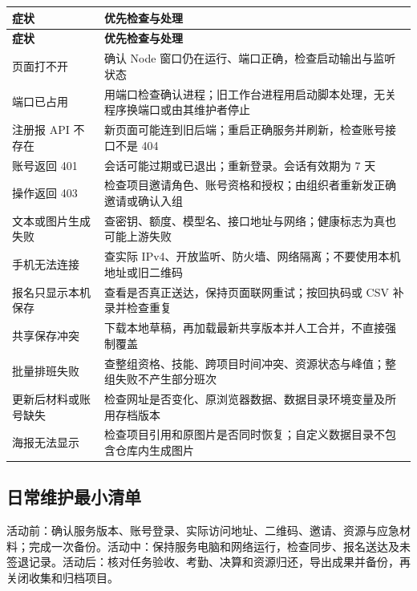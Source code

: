 \documentclass[UTF8,fontset=windows,zihao=-4,a4paper]{ctexart}
\begin{document}
\begingroup\small\setlength{\tabcolsep}{5pt}\renewcommand{\arraystretch}{1.28}
\begin{longtable}{>{\raggedright\arraybackslash}p{0.28\dimexpr\linewidth-4\tabcolsep\relax}>{\raggedright\arraybackslash}p{0.72\dimexpr\linewidth-4\tabcolsep\relax}}
\toprule
\textbf{症状} & \textbf{优先检查与处理} \\
\midrule\endfirsthead
\toprule
\textbf{症状} & \textbf{优先检查与处理} \\
\midrule\endhead
\bottomrule\endfoot
页面打不开 & 确认 Node 窗口仍在运行、端口正确，检查启动输出与监听状态 \\
端口已占用 & 用端口检查确认进程；旧工作台进程用启动脚本处理，无关程序换端口或由其维护者停止 \\
注册报 API 不存在 & 新页面可能连到旧后端；重启正确服务并刷新，检查账号接口不是 404 \\
账号返回 401 & 会话可能过期或已退出；重新登录。会话有效期为 7 天 \\
操作返回 403 & 检查项目邀请角色、账号资格和授权；由组织者重新发正确邀请或确认入组 \\
文本或图片生成失败 & 查密钥、额度、模型名、接口地址与网络；健康标志为真也可能上游失败 \\
手机无法连接 & 查实际 IPv4、开放监听、防火墙、网络隔离；不要使用本机地址或旧二维码 \\
报名只显示本机保存 & 查看是否真正送达，保持页面联网重试；按回执码或 CSV 补录并检查重复 \\
共享保存冲突 & 下载本地草稿，再加载最新共享版本并人工合并，不直接强制覆盖 \\
批量排班失败 & 查整组资格、技能、跨项目时间冲突、资源状态与峰值；整组失败不产生部分班次 \\
更新后材料或账号缺失 & 检查网址是否变化、原浏览器数据、数据目录环境变量及所用存档版本 \\
海报无法显示 & 检查项目引用和原图片是否同时恢复；自定义数据目录不包含仓库内生成图片 \\
\end{longtable}\endgroup

\subsection*{日常维护最小清单}

活动前：确认服务版本、账号登录、实际访问地址、二维码、邀请、资源与应急材料；完成一次备份。活动中：保持服务电脑和网络运行，检查同步、报名送达及未签退记录。活动后：核对任务验收、考勤、决算和资源归还，导出成果并备份，再关闭收集和归档项目。
\end{document}
